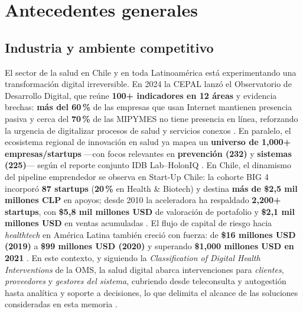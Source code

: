 %
%



%

\section{Antecedentes generales}
\subsection{Industria y ambiente competitivo}


El sector de la salud en Chile y en toda Latinoamérica está experimentando una transformación digital irreversible. En 2024 la CEPAL lanzó el Observatorio de Desarrollo Digital, que reúne \textbf{100+ indicadores en 12 áreas} y evidencia brechas: \textbf{más del 60\,\%} de las empresas que usan Internet mantienen presencia pasiva y cerca del \textbf{70\,\%} de las MIPYMES no tiene presencia en línea, reforzando la urgencia de digitalizar procesos de salud y servicios conexos \citep{CepalDDO2024}. En paralelo, el ecosistema regional de innovación en salud ya mapea un \textbf{universo de 1{,}000+ empresas/startups} —con focos relevantes en \textbf{prevención (232)} y \textbf{sistemas (225)}— según el reporte conjunto IDB Lab–HolonIQ \citep{IDBLabHolonIQ2024}. En Chile, el dinamismo del pipeline emprendedor se observa en Start-Up Chile: la cohorte BIG 4 incorporó \textbf{87 startups} (\textbf{20\,\%} en Health \& Biotech) y destina \textbf{más de \$2{,}5 mil millones CLP} en apoyos; desde 2010 la aceleradora ha respaldado \textbf{2{,}200+ startups}, con \textbf{\$5{,}8 mil millones USD} de valoración de portafolio y \textbf{\$2{,}1 mil millones USD} en ventas acumuladas \citep{StartUpChile2025}. El flujo de capital de riesgo hacia \textit{healthtech} en América Latina también creció con fuerza: de \textbf{\$16 millones USD (2019)} a \textbf{\$99 millones USD (2020)} y superando \textbf{\$1{,}000 millones USD en 2021} \citep{EmolHealthtech2023}. En este contexto, y siguiendo la \textit{Classification of Digital Health Interventions} de la OMS, la salud digital abarca intervenciones para \textit{clientes}, \textit{proveedores} y \textit{gestores del sistema}, cubriendo desde teleconsulta y autogestión hasta analítica y soporte a decisiones, lo que delimita el alcance de las soluciones consideradas en esta memoria \citep{WHOCDHI2018}.


